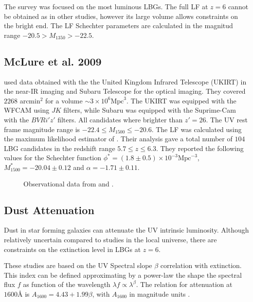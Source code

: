 \documentclass{emulateapj}
\begin{document}
The survey was focused on the most luminous LBGs. 
The full LF at $z=6$ cannot be obtained as in other studies, however
its large volume allows constraints on the bright end.
The LF Schechter parameters are calculated in the magnitud range 
$-20.5 > M_{1350} > -22.5$.

\subsection{McLure et al. 2009}

\citet{McLure09} used data obtained with the 
the United Kingdom Infrared Telescope (UKIRT) in the near-IR imaging
and Subaru Telescope for the optical imaging. 
They covered $2268$ arcmin$^{2}$  for a volume $\sim 3 \times 10^6 \textrm{Mpc}^3$.
The UKIRT was equipped with the WFCAM using $J K$ filters, while Subaru was 
equipped with the Suprime-Cam with the $B V R i' z'$ filters. 
All candidates  where brighter than $z'=26$. 
The UV rest frame magnitude range is 
$-22.4\leq M_{1500} \leq-20.6$. 
The LF was calculated using the maximum 
likelihood estimator of \citet{Schmidt68}. 
Their analysis gave a total number of 
$104$ LBG candidates in the redshift range $5.7\leq z \leq 6.3$. 
They reported the following values for the Schechter function
$\phi^* =(1.8\pm 0.5)\times 10 ^{-3} \textrm{Mpc}^{-3}$, 
$M^*_{1500} = -20.04\pm 0.12$ and $\alpha = -1.71 \pm 0.11$. 


\begin{figure}
\caption{Observational data from \cite{Bouwens15,Finkelstein14,McLure09}and \cite{Willott13}.}
\label{graph_observational_data}
\end{figure}

\subsection{Dust Attenuation}
\label{subsec:dust}
Dust in star forming galaxies can attenuate the UV intrinsic luminosity.
Although relatively uncertain compared to studies in the local
universe, there are constraints on the extinction level in LBGs at
$z=6$.

These studies are based on the UV Spectral slope $\beta$ correlation
with extinction. 
This index can be defined approximating by a power-law
the shape  the spectral flux $f$ as function of the wavelength
$\lambda f \propto \lambda^\beta$.  
The relation for attenuation at $1600 \textrm{\AA}$ is $A_{1600} =
4.43 + 1.99 \beta$, with $A_{1600}$ in magnitude units
\citet{Meurer99}.  
\end{document}
